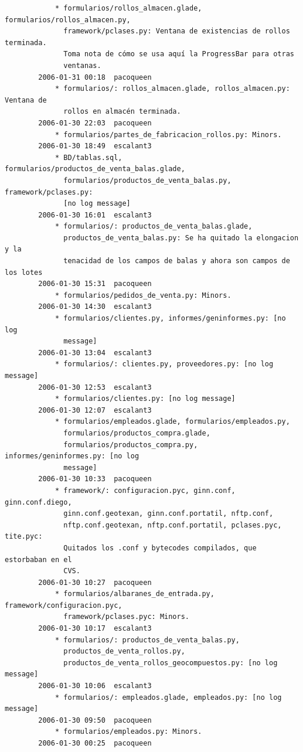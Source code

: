 \documentclass[a4paper]{article}
\begin{document}
\begin{verbatim}
            * formularios/rollos_almacen.glade, formularios/rollos_almacen.py,
              framework/pclases.py: Ventana de existencias de rollos terminada.
              Toma nota de cómo se usa aquí la ProgressBar para otras
              ventanas.
        2006-01-31 00:18  pacoqueen
            * formularios/: rollos_almacen.glade, rollos_almacen.py: Ventana de
              rollos en almacén terminada.
        2006-01-30 22:03  pacoqueen
            * formularios/partes_de_fabricacion_rollos.py: Minors.
        2006-01-30 18:49  escalant3
            * BD/tablas.sql, formularios/productos_de_venta_balas.glade,
              formularios/productos_de_venta_balas.py, framework/pclases.py:
              [no log message]
        2006-01-30 16:01  escalant3
            * formularios/: productos_de_venta_balas.glade,
              productos_de_venta_balas.py: Se ha quitado la elongacion y la
              tenacidad de los campos de balas y ahora son campos de los lotes
        2006-01-30 15:31  pacoqueen
            * formularios/pedidos_de_venta.py: Minors.
        2006-01-30 14:30  escalant3
            * formularios/clientes.py, informes/geninformes.py: [no log
              message]
        2006-01-30 13:04  escalant3
            * formularios/: clientes.py, proveedores.py: [no log message]
        2006-01-30 12:53  escalant3
            * formularios/clientes.py: [no log message]
        2006-01-30 12:07  escalant3
            * formularios/empleados.glade, formularios/empleados.py,
              formularios/productos_compra.glade,
              formularios/productos_compra.py, informes/geninformes.py: [no log
              message]
        2006-01-30 10:33  pacoqueen
            * framework/: configuracion.pyc, ginn.conf, ginn.conf.diego,
              ginn.conf.geotexan, ginn.conf.portatil, nftp.conf,
              nftp.conf.geotexan, nftp.conf.portatil, pclases.pyc, tite.pyc:
              Quitados los .conf y bytecodes compilados, que estorbaban en el
              CVS.
        2006-01-30 10:27  pacoqueen
            * formularios/albaranes_de_entrada.py, framework/configuracion.pyc,
              framework/pclases.pyc: Minors.
        2006-01-30 10:17  escalant3
            * formularios/: productos_de_venta_balas.py,
              productos_de_venta_rollos.py,
              productos_de_venta_rollos_geocompuestos.py: [no log message]
        2006-01-30 10:06  escalant3
            * formularios/: empleados.glade, empleados.py: [no log message]
        2006-01-30 09:50  pacoqueen
            * formularios/empleados.py: Minors.
        2006-01-30 00:25  pacoqueen

\end{verbatim}
\end{document}

